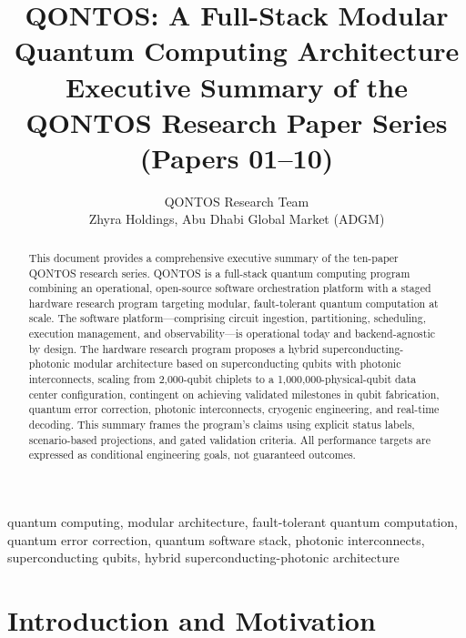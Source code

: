\documentclass[conference]{IEEEtran}
\newcommand{\qontosauthor}{QONTOS Research Team\\Zhyra Holdings, Abu Dhabi Global Market (ADGM)}
\begin{document}
\title{QONTOS: A Full-Stack Modular Quantum Computing Architecture\\
Executive Summary of the QONTOS Research Paper Series (Papers 01--10)}
\author{\qontosauthor}
\maketitle

\begin{abstract}
This document provides a comprehensive executive summary of the ten-paper QONTOS research series. QONTOS is a full-stack quantum computing program combining an operational, open-source software orchestration platform with a staged hardware research program targeting modular, fault-tolerant quantum computation at scale. The software platform---comprising circuit ingestion, partitioning, scheduling, execution management, and observability---is operational today and backend-agnostic by design. The hardware research program proposes a hybrid superconducting-photonic modular architecture based on superconducting qubits with photonic interconnects, scaling from 2,000-qubit chiplets to a 1,000,000-physical-qubit data center configuration, contingent on achieving validated milestones in qubit fabrication, quantum error correction, photonic interconnects, cryogenic engineering, and real-time decoding. This summary frames the program's claims using explicit status labels, scenario-based projections, and gated validation criteria. All performance targets are expressed as conditional engineering goals, not guaranteed outcomes.
\end{abstract}

\begin{IEEEkeywords}
quantum computing, modular architecture, fault-tolerant quantum computation, quantum error correction, quantum software stack, photonic interconnects, superconducting qubits, hybrid superconducting-photonic architecture
\end{IEEEkeywords}


\section{Introduction and Motivation}
\end{document}
